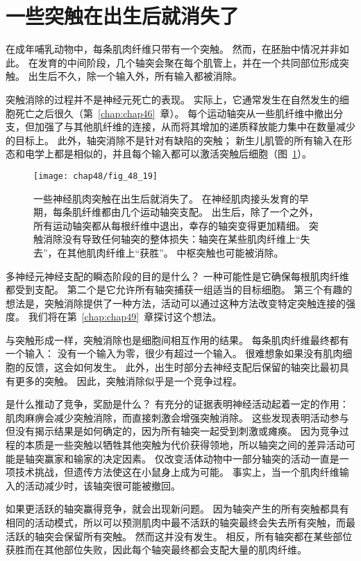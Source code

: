 \section{一些突触在出生后就消失了}

在成年哺乳动物中，每条肌肉纤维只带有一个突触。
然而，在胚胎中情况并非如此。
在发育的中间阶段，几个轴突会聚在每个肌管上，并在一个共同部位形成突触。
出生后不久，除一个输入外，所有输入都被消除。


突触消除的过程并不是神经元死亡的表现。 实际上，它通常发生在自然发生的细胞死亡之后很久（第~\ref{chap:chap46}~章）。
每个运动轴突从一些肌纤维中撤出分支，但加强了与其他肌纤维的连接，从而将其增加的递质释放能力集中在数量减少的目标上。
此外，轴突消除不是针对有缺陷的突触；
新生儿肌管的所有输入在形态和电学上都是相似的，并且每个输入都可以激活突触后细胞（图~\ref{fig:48_19}）。


\begin{figure}[htbp]
	\centering
	\texttt{[image: chap48/fig\_48\_19]}
	\caption{一些神经肌肉突触在出生后就消失了。
		在神经肌肉接头发育的早期，每条肌纤维都由几个运动轴突支配。
		出生后，除了一个之外，所有运动轴突都从每根纤维中退出，幸存的轴突变得更加精细。
		突触消除没有导致任何轴突的整体损失：轴突在某些肌肉纤维上“失去”，在其他肌肉纤维上“获胜”。
		中枢突触也可能被消除。}
	\label{fig:48_19}
\end{figure}


多神经元神经支配的瞬态阶段的目的是什么？
一种可能性是它确保每根肌肉纤维都受到支配。
第二个是它允许所有轴突捕获一组适当的目标细胞。
第三个有趣的想法是，突触消除提供了一种方法，活动可以通过这种方法改变特定突触连接的强度。
我们将在第~\ref{chap:chap49}~章探讨这个想法。


与突触形成一样，突触消除也是细胞间相互作用的结果。
每条肌肉纤维最终都有一个输入：
没有一个输入为零，很少有超过一个输入。
很难想象如果没有肌肉细胞的反馈，这会如何发生。
此外，出生时部分去神经支配后保留的轴突比最初具有更多的突触。
因此，突触消除似乎是一个竞争过程。


是什么推动了竞争，奖励是什么？
有充分的证据表明神经活动起着一定的作用：
肌肉麻痹会减少突触消除，而直接刺激会增强突触消除。
这些发现表明活动参与但没有揭示结果是如何确定的，因为所有轴突一起受到刺激或瘫痪。
因为竞争过程的本质是一些突触以牺牲其他突触为代价获得领地，所以轴突之间的差异活动可能是轴突赢家和输家的决定因素。
仅改变活体动物中一部分轴突的活动一直是一项技术挑战，但遗传方法使这在小鼠身上成为可能。
事实上，当一个肌肉纤维输入的活动减少时，该轴突很可能被撤回。


如果更活跃的轴突赢得竞争，就会出现新问题。
因为轴突产生的所有突触都具有相同的活动模式，所以可以预测肌肉中最不活跃的轴突最终会失去所有突触，而最活跃的轴突会保留所有突触。
然而这并没有发生。
相反，所有轴突都在某些部位获胜而在其他部位失败，因此每个轴突最终都会支配大量的肌肉纤维。



